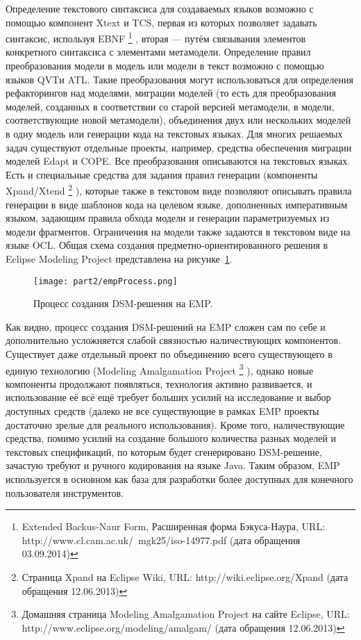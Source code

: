 Определение текстового синтаксиса для создаваемых языков возможно с помощью компонент 
Xtext и TCS, первая из которых позволяет задавать синтаксис, используя EBNF%
\footnote{Extended Backus-Naur Form, Расширенная форма Бэкуса-Наура, URL: http://www.cl.cam.ac.uk/~mgk25/iso-14977.pdf (дата обращения 03.09.2014)}%
, вторая --- путём связывания элементов конкретного синтаксиса с элементами метамодели. Определение 
правил преобразования модели в модель или модели в текст возможно с помощью языков 
QVTи ATL. Такие преобразования могут использоваться для определения рефакторингов 
над моделями, миграции моделей (то есть для преобразования моделей, созданных в соответствии 
со старой версией метамодели, в модели, соответствующие новой метамодели), объединения 
двух или нескольких моделей в одну модель или генерации кода на текстовых языках. 
Для многих решаемых задач существуют отдельные проекты, например, средства обеспечения
миграции моделей Edapt и COPE.
Все преобразования описываются на текстовых языках. Есть и специальные средства для задания правил генерации (компоненты Xpand/Xtend%
\footnote{Страница Xpand на Eclipse Wiki, URL: http://wiki.eclipse.org/Xpand (дата обращения 12.06.2013)}%
), которые также в текстовом виде позволяют описывать правила генерации в виде шаблонов кода на целевом языке, дополненных 
императивным языком, задающим правила обхода модели и генерации параметризуемых из модели 
фрагментов. Ограничения на модели также задаются в текстовом виде на языке OCL. Общая 
схема создания предметно-ориентированного решения в Eclipse Modeling Project представлена на рисунке~\ref{empProcess}.

\begin{figure} [ht]
	\begin{center}
		\texttt{[image: part2/empProcess.png]}
		\caption{Процесс создания DSM-решения на EMP.}
		\label{empProcess}
	\end{center}
\end{figure}

Как видно, процесс создания DSM-решений на EMP сложен сам по себе и дополнительно 
усложняется слабой связностью наличествующих компонентов. Существует даже отдельный 
проект по объединению всего существующего в единую технологию (Modeling Amalgamation Project%
\footnote{Домашняя страница Modeling Amalgamation Project на сайте Eclipse, URL:  http://www.eclipse.org/modeling/amalgam/ (дата обращения 12.06.2013)}%
), однако новые компоненты продолжают появляться, технология активно развивается, и использование 
её всё ещё требует больших усилий на исследование и выбор доступных средств (далеко 
не все существующие в рамках EMP проекты достаточно зрелые для реального использования). 
Кроме того, наличествующие средства, помимо усилий на создание большого количества 
разных моделей и текстовых спецификаций, по которым будет сгенерировано DSM-решение, 
зачастую требуют и ручного кодирования на языке Java. Таким образом, EMP используется 
в основном как база для разработки более доступных для конечного пользователя инструментов.

